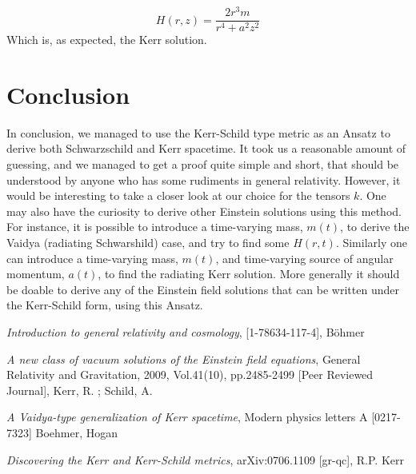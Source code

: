 \documentclass[a4paper,12pt]{article}
\theoremstyle{definition}
\begin{document}
\begin{equation}
	H(r,z)=\frac{2r^3m}{r^4+a^2z^2}
\end{equation}
Which is, as expected, the Kerr solution.

\section{Conclusion}
In conclusion, we managed to use the Kerr-Schild type metric as an Ansatz to derive both Schwarzschild and Kerr spacetime.
It took us a reasonable amount of guessing, and we managed to get a proof quite simple and short, that should be understood by anyone who has some rudiments in general relativity.
However, it would be interesting to take a closer look at our choice for the tensors $k$.
One may also have the curiosity to derive other Einstein solutions using this method.
For instance, it is possible to introduce a time-varying mass, $m(t)$, to derive the Vaidya (radiating Schwarshild) case, and try to find some $H(r,t)$.
Similarly one can introduce a time-varying mass, $m(t)$, and time-varying source of angular momentum, $a(t)$, to find the radiating Kerr solution.
More generally it should be doable to derive any of the Einstein field solutions that can be written under the Kerr-Schild form, using this Ansatz.

\pagebreak
\appendix




\begin{thebibliography}{9}
	\emph{Introduction to general relativity and cosmology}, [1-78634-117-4], B\"ohmer

	\emph{A new class of vacuum solutions of the Einstein field equations}, General Relativity and Gravitation, 2009, Vol.41(10), pp.2485-2499 [Peer Reviewed Journal], Kerr, R. ; Schild, A.
	
	\emph{A Vaidya-type generalization of Kerr spacetime}, Modern physics letters A [0217-7323] Boehmer, Hogan
	 
	\emph{Discovering the Kerr and Kerr-Schild metrics}, arXiv:0706.1109 [gr-qc], R.P. Kerr
\end{thebibliography}
\end{document}

